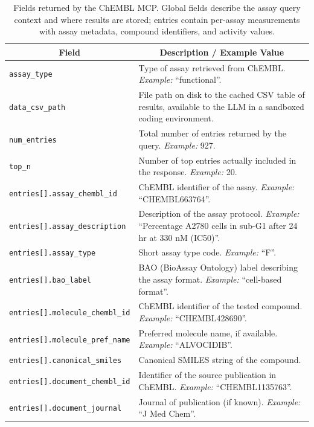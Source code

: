 \documentclass{article}
\begin{document}
\begin{table}[!htbp]
\caption{Fields returned by the ChEMBL MCP. Global fields describe the assay query context and where results are stored; entries contain per-assay measurements with assay metadata, compound identifiers, and activity values.}
\label{tab:chembl-mcp}
\begin{center}
\begin{tabularx}{\textwidth}{p{6cm}X}
\toprule
\multicolumn{1}{c}{\bf Field} & \multicolumn{1}{c}{\bf Description / Example Value} \\
\midrule
\texttt{assay\_type} & Type of assay retrieved from ChEMBL. \emph{Example:} “functional”. \\
\addlinespace
\texttt{data\_csv\_path} & File path on disk to the cached CSV table of results, available to the LLM in a sandboxed coding environment. \\
\addlinespace
\texttt{num\_entries} & Total number of entries returned by the query. \emph{Example:} 927. \\
\addlinespace
\texttt{top\_n} & Number of top entries actually included in the response. \emph{Example:} 20. \\
\addlinespace
\texttt{entries[].assay\_chembl\_id} & ChEMBL identifier of the assay. \emph{Example:} “CHEMBL663764”. \\
\addlinespace
\texttt{entries[].assay\_description} & Description of the assay protocol. \emph{Example:} “Percentage A2780 cells in sub-G1 after 24 hr at 330 nM (IC50)”. \\
\addlinespace
\texttt{entries[].assay\_type} & Short assay type code. \emph{Example:} “F”. \\
\addlinespace
\texttt{entries[].bao\_label} & BAO (BioAssay Ontology) label describing the assay format. \emph{Example:} “cell-based format”. \\
\addlinespace
\texttt{entries[].molecule\_chembl\_id} & ChEMBL identifier of the tested compound. \emph{Example:} “CHEMBL428690”. \\
\addlinespace
\texttt{entries[].molecule\_pref\_name} & Preferred molecule name, if available. \emph{Example:} “ALVOCIDIB”. \\
\addlinespace
\texttt{entries[].canonical\_smiles} & Canonical SMILES string of the compound. \\
\addlinespace
\texttt{entries[].document\_chembl\_id} & Identifier of the source publication in ChEMBL. \emph{Example:} “CHEMBL1135763”. \\
\addlinespace
\texttt{entries[].document\_journal} & Journal of publication (if known). \emph{Example:} “J Med Chem”. \\

\end{tabularx}
\end{center}
\end{table}
\end{document}
